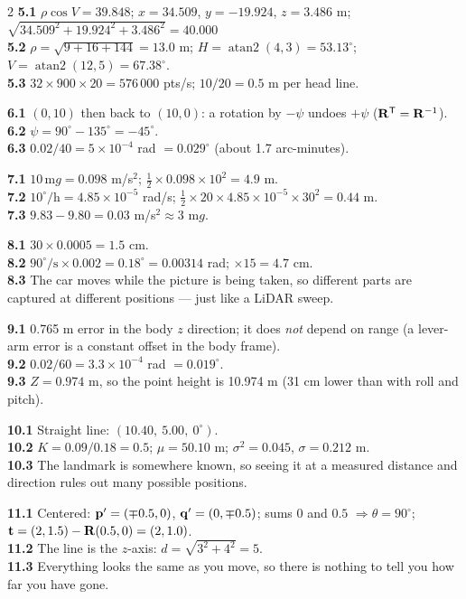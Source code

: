 \begin{multicols}{2}
\textbf{5.1} $\rho\cos V=39.848$; $x=34.509$, $y=-19.924$, $z=3.486$ m; $\sqrt{34.509^2+19.924^2+3.486^2}=40.000$ \checkmark\\
\textbf{5.2} $\rho=\sqrt{9+16+144}=13.0$ m; $H=\operatorname{atan2}(4,3)=53.13^\circ$; $V=\operatorname{atan2}(12,5)=67.38^\circ$.\\
\textbf{5.3} $32\times900\times20=576\,000$ pts/s; $10/20=0.5$ m per head line.

\textbf{6.1} $(0,10)$ then back to $(10,0)$: a rotation by $-\psi$ undoes $+\psi$ ($\mathbf{R}^{\mathsf T}=\mathbf{R}^{-1}$).\\
\textbf{6.2} $\psi=90^\circ-135^\circ=-45^\circ$.\\
\textbf{6.3} $0.02/40=5\times10^{-4}$ rad $=0.029^\circ$ (about 1.7 arc-minutes).

\textbf{7.1} $10\,\text{m}g=0.098$ m/s$^2$; $\tfrac12\times0.098\times10^2=4.9$ m.\\
\textbf{7.2} $10^\circ/\text{h}=4.85\times10^{-5}$ rad/s; $\tfrac12\times20\times4.85\times10^{-5}\times30^2=0.44$ m.\\
\textbf{7.3} $9.83-9.80=0.03$ m/s$^2\approx3$ m$g$.

\textbf{8.1} $30\times0.0005=1.5$ cm.\\
\textbf{8.2} $90^\circ/\text{s}\times0.002=0.18^\circ=0.00314$ rad; $\times15=4.7$ cm.\\
\textbf{8.3} The car moves while the picture is being taken, so different parts are captured at different positions --- just like a LiDAR sweep.

\textbf{9.1} 0.765 m error in the body $z$ direction; it does \emph{not} depend on range (a lever-arm error is a constant offset in the body frame).\\
\textbf{9.2} $0.02/60=3.3\times10^{-4}$ rad $=0.019^\circ$.\\
\textbf{9.3} $Z=0.974$ m, so the point height is 10.974 m (31 cm lower than with roll and pitch).

\textbf{10.1} Straight line: $(10.40,\ 5.00,\ 0^\circ)$.\\
\textbf{10.2} $K=0.09/0.18=0.5$; $\mu=50.10$ m; $\sigma^2=0.045$, $\sigma=0.212$ m.\\
\textbf{10.3} The landmark is somewhere known, so seeing it at a measured distance and direction rules out many possible positions.

\textbf{11.1} Centered: $\mathbf{p}'=(\mp0.5,0)$, $\mathbf{q}'=(0,\mp0.5)$; sums $0$ and $0.5$ $\Rightarrow\theta=90^\circ$; $\mathbf{t}=(2,1.5)-\mathbf{R}(0.5,0)=(2,1.0)$.\\
\textbf{11.2} The line is the $z$-axis: $d=\sqrt{3^2+4^2}=5$.\\
\textbf{11.3} Everything looks the same as you move, so there is nothing to tell you how far you have gone.


\end{multicols}
